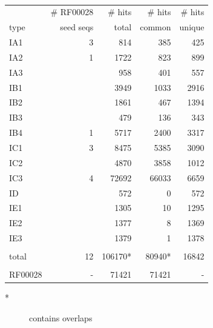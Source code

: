 \documentclass[landscape]{slides}
\begin{document}
\begin{slide}
\tt
\small
\begin{center}
\begin{tabular}{l|r|rrr}
        & \# RF00028 & \# hits   & \# hits& \# hits\\
type    & seed seqs  & total     & common & unique \\ \hline
IA1     & 3          &  814      & 385    & 425    \\
IA2     & 1          &  1722     & 823    & 899    \\
IA3     &            &   958     & 401    & 557    \\
IB1     &            &  3949     & 1033   & 2916   \\
IB2     &            & 1861     & 467    & 1394   \\
IB3     &            & 479     & 136    & 343    \\
IB4     &  1         & 5717     & 2400   & 3317   \\
IC1     &  3         & 8475     & 5385   & 3090   \\
IC2     &            & 4870     & 3858   & 1012   \\
IC3     & 4          & 72692     & 66033  & 6659   \\
ID      &            & 572     & 0      & 572    \\
IE1     &            & 1305     & 10     & 1295   \\
IE2     &            & 1377     & 8      & 1369   \\
IE3     &            & 1379     & 1      & 1378   \\
        &            &          &        &        \\
total   & 12         & 106170*   & 80940* &  16842 \\
        &           &           &        \\
RF00028 & -         & 71421     & 71421  & -      \\
\end{tabular}

\begin{description}
\item[*] contains overlaps
\end{description}


\end{center}

\vfill
\end{slide}
\end{document}
